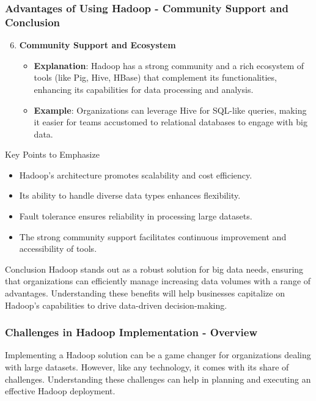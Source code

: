 \documentclass[aspectratio=169]{beamer}
\begin{document}
\begin{frame}[fragile]
    \frametitle{Advantages of Using Hadoop - Community Support and Conclusion}
    \begin{enumerate}
        \setcounter{enumi}{5}
        \item \textbf{Community Support and Ecosystem}
        \begin{itemize}
            \item \textbf{Explanation}: Hadoop has a strong community and a rich ecosystem of tools (like Pig, Hive, HBase) that complement its functionalities, enhancing its capabilities for data processing and analysis.
            \item \textbf{Example}: Organizations can leverage Hive for SQL-like queries, making it easier for teams accustomed to relational databases to engage with big data.
        \end{itemize}
    \end{enumerate}

    \begin{block}{Key Points to Emphasize}
        \begin{itemize}
            \item Hadoop's architecture promotes scalability and cost efficiency.
            \item Its ability to handle diverse data types enhances flexibility.
            \item Fault tolerance ensures reliability in processing large datasets.
            \item The strong community support facilitates continuous improvement and accessibility of tools.
        \end{itemize}
    \end{block}

    \begin{block}{Conclusion}
        Hadoop stands out as a robust solution for big data needs, ensuring that organizations can efficiently manage increasing data volumes with a range of advantages. Understanding these benefits will help businesses capitalize on Hadoop’s capabilities to drive data-driven decision-making.
    \end{block}
\end{frame}

\begin{frame}[fragile]
    \frametitle{Challenges in Hadoop Implementation - Overview}
    Implementing a Hadoop solution can be a game changer for organizations dealing with large datasets. 
    However, like any technology, it comes with its share of challenges. 
    Understanding these challenges can help in planning and executing an effective Hadoop deployment.
\end{frame}
\end{document}
